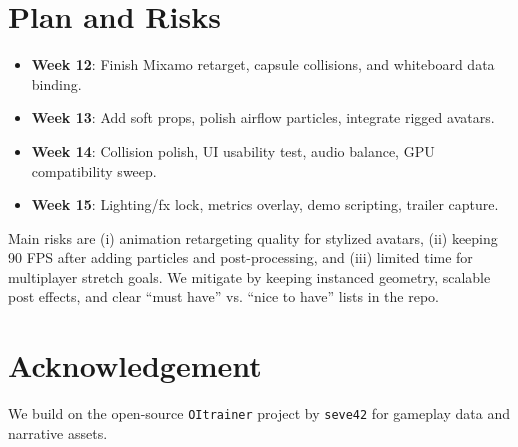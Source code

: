 \documentclass[sigconf]{acmart}
\begin{document}
\section{Plan and Risks}

\begin{itemize}
  \item \textbf{Week 12}: Finish Mixamo retarget, capsule collisions, and
  whiteboard data binding.
  \item \textbf{Week 13}: Add soft props, polish airflow particles, integrate
  rigged avatars.
  \item \textbf{Week 14}: Collision polish, UI usability test, audio balance,
  GPU compatibility sweep.
  \item \textbf{Week 15}: Lighting/fx lock, metrics overlay, demo scripting,
  trailer capture.
\end{itemize}

\noindent Main risks are (i) animation retargeting quality for stylized
avatars, (ii) keeping 90 FPS after adding particles and post-processing, and
(iii) limited time for multiplayer stretch goals. We mitigate by keeping
instanced geometry, scalable post effects, and clear ``must have'' vs.
``nice to have'' lists in the repo.

\section{Acknowledgement}

We build on the open-source \texttt{OItrainer} project by \texttt{seve42}
for gameplay data and narrative assets.





\end{document}
